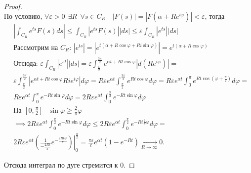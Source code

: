 \documentclass[../paper.tex]{subfile}
\begin{document}
\begin{proof} $ $ \\
%


По условию, $\forall \varepsilon > 0 \ \  \exists R \ \ \forall s \in C_R \quad \left| F(s) \right| = \left| F\left(\alpha + Re^{i\varphi}\right) \right|  < \varepsilon$, тогда
%
\begin{align*}
    & \left|\int_{C_R} e^{ts} F(s) ds\right| \le
      \int_{C_R} \left|e^{ts} F(s)\right| |ds| \le
      \varepsilon \int_{C_R} \left|e^{ts}\right| |ds|  \\
%
    & \text{Рассмотрим на $C_R$: } \left|e^{ts}\right| = \left|e^{t\left(\alpha+R\cos\varphi+Ri\sin\varphi\right)}\right| = e^{t\left(\alpha + R\cos\varphi\right)} \\
%
    & \text{Отсюда: } \varepsilon \int_{C_R} \left|e^{st}\right| |ds| = 
      \varepsilon \int_{\frac{\pi}{2}}^{\frac{3\pi}{2}} e^{\alpha t + R t \cos \varphi} \left|d\left(Re^{i\varphi}\right)\right| = \\
%
    & \varepsilon \int_{\frac{\pi}{2}}^{\frac{3\pi}{2}} \left|e^{\alpha t + R t \cos \varphi} R i e^{i\varphi} \right| d\varphi = 
      R\varepsilon e^{\alpha t} \int_{\frac{\pi}{2}}^{\frac{3\pi}{2}} e^{R t \cos\varphi} d\varphi = 
      R\varepsilon e^{\alpha t} \int_{0}^{\pi} e^{R t \cos \left(\varphi + \frac{\pi}{2}\right)} d\varphi = \\
%
    & R\varepsilon e^{\alpha t} \int_{0}^{\pi} e^{-R t \sin\varphi} d\varphi = 
      2R\varepsilon e^{\alpha t} \int_{0}^{\frac{\pi}{2}} e^{-R t \sin\varphi} d\varphi \\
%
    & \text{На $[0, \frac{\pi}{2}]$ } \sin\varphi \ge \frac{2}{\pi} \varphi \\
%
    & \implies 2R\varepsilon e^{\alpha t} \int_{0}^{\frac{\pi}{2}} e^{-R t \sin\varphi} d\varphi \le
      2R\varepsilon e^{\alpha t} \int_{0}^{\frac{\pi}{2}} e^{-R t \frac{2}{\pi}\varphi} d\varphi = \\
%
    & 2R\varepsilon e^{\alpha t} \left.\left( \frac{1}{-\frac{2Rt}{\pi}}e^{- \frac{2 R t \varphi}{\pi}} \right) \right|_0^{\frac{\pi}{2}} = 
         \frac{\pi\varepsilon}{t} e^{\alpha t} \left(1 - e^{- R t} \right) \xrightarrow[R \to \infty]{} 0
.\end{align*}

Отсюда интеграл по дуге стремится к $0$.
\end{proof}
\end{document}
